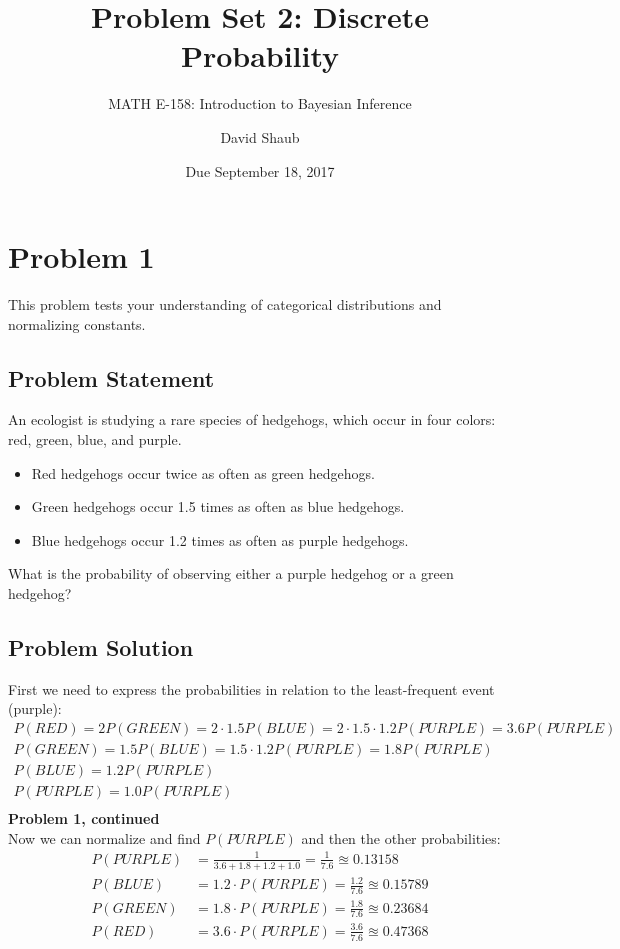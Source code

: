 \documentclass[12pt]{article}
\title{Problem Set 2: Discrete Probability}
\author{MATH E-158: Introduction to Bayesian Inference}
\author{David Shaub}
\date{Due September 18, 2017}
\theoremstyle{definition}
\begin{document}
\maketitle





\section*{Problem 1}

This problem tests your understanding of categorical distributions and normalizing constants.

\subsection*{Problem Statement}

An ecologist is studying a rare species of hedgehogs, which occur in four colors: red, green, blue, and purple.
\begin{itemize}
	\item Red hedgehogs occur twice as often as green hedgehogs.
	\item Green hedgehogs occur 1.5 times as often as blue hedgehogs.
	\item Blue hedgehogs occur 1.2 times as often as purple hedgehogs.
\end{itemize}
What is the probability of observing either a purple hedgehog or a green hedgehog?

\subsection*{Problem Solution}
First we need to express the probabilities in relation to the least-frequent event (purple):
\begin{align*}
P(RED) = 2P(GREEN)=2 \cdot 1.5P(BLUE) = 2 \cdot 1.5 \cdot 1.2P(PURPLE) = 3.6P(PURPLE)\\
P(GREEN) = 1.5P(BLUE) = 1.5 \cdot 1.2P(PURPLE) = 1.8P(PURPLE)\\
P(BLUE) = 1.2P(PURPLE)\\
P(PURPLE) = 1.0P(PURPLE)\\
\end{align*}
\newpage
\noindent
{\bf Problem 1, continued}\\
Now we can normalize and find $P(PURPLE)$ and then the other probabilities:
\begin{align*}
P(PURPLE) &= \frac{1}{3.6 + 1.8 + 1.2 + 1.0} = \frac{1}{7.6} \approxeq 0.13158\\
P(BLUE) &= 1.2 \cdot P(PURPLE) = \frac{1.2}{7.6} \approxeq 0.15789\\
P(GREEN) &= 1.8 \cdot P(PURPLE) = \frac{1.8}{7.6} \approxeq 0.23684\\
P(RED) &= 3.6 \cdot P(PURPLE) = \frac{3.6}{7.6} \approxeq 0.47368\\
\end{align*}
\end{document}
